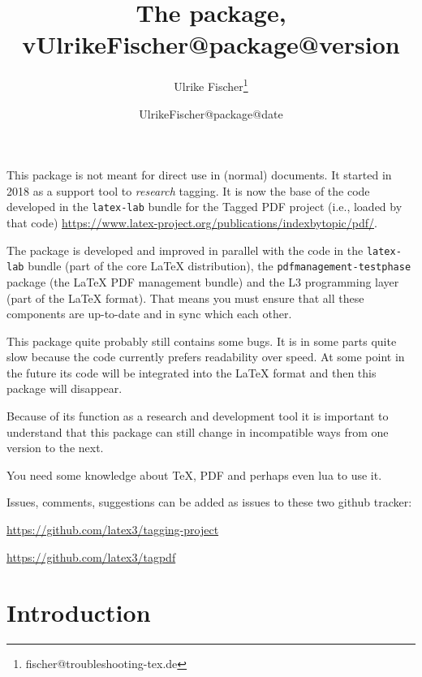 \documentclass[bibliography=totoc,a4paper]{article}
\title{The \pkg{tagpdf} package, v\csname UlrikeFischer@package@version\endcsname}
\date{\csname UlrikeFischer@package@date\endcsname}
\author{Ulrike Fischer\thanks{fischer@troubleshooting-tex.de}}
\newcommand\pkg[1]{\texttt{#1}}
\newcommand\PDF{PDF}
\begin{document}
\maketitle

\begin{tcolorbox}[colframe=red]

This package is not meant for direct use in (normal) documents. It started in 2018 as 
a support tool to \emph{research} tagging. It is now the base of the code developed 
in the \pkg{latex-lab} bundle for the Tagged PDF project (i.e., loaded by that code)
\url{https://www.latex-project.org/publications/indexbytopic/pdf/}. 

The package is developed and improved in parallel with the code in the \pkg{latex-lab} 
bundle (part of the core \LaTeX{} distribution),  the \pkg{pdfmanagement-testphase} 
package (the \LaTeX{} PDF management bundle) and the L3 programming layer (part of the \LaTeX{} format). 
That means you must ensure that all these components are up-to-date and in 
sync which each other. 

This package quite probably still contains some bugs. It is in some parts quite slow because
the code currently prefers readability over speed. At some point in the future its code will 
be integrated into the \LaTeX{} format and then this package will disappear. 

Because of its function as a research and development tool it is
important to understand that this package can still change in
incompatible ways from one version to the next.

You need some knowledge about \TeX, \PDF{} and perhaps even lua to use it.

\medskip

Issues, comments, suggestions can be added as issues to these two github tracker:

\medskip
\centering \url{https://github.com/latex3/tagging-project}\par 
\leavevmode{} \url{https://github.com/latex3/tagpdf} 

\end{tcolorbox}



\tableofcontents



\section{Introduction}
\end{document}
